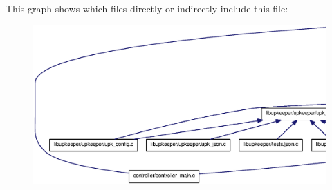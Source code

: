 This graph shows which files directly or indirectly include this file:
\nopagebreak
\begin{figure}[H]
\begin{center}
\leavevmode
\includegraphics[width=400pt]{upk__std__include_8h__dep__incl}
\end{center}
\end{figure}
